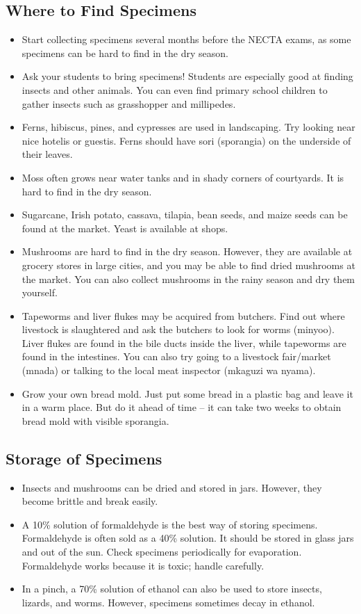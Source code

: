 \subsection{Where to Find Specimens}
\begin{itemize}
\item{Start collecting specimens several months before the NECTA exams, as some specimens can be hard to find in the dry season.}
\item{Ask your students to bring specimens! Students are especially good at finding insects and other animals. You can even find primary school children to gather insects such as grasshopper and millipedes.}
\item{Ferns, hibiscus, pines, and cypresses are used in landscaping. Try looking near nice hotelis or guestis. Ferns should have sori (sporangia) on the underside of their leaves.}
\item{Moss often grows near water tanks and in shady corners of courtyards. It is hard to find in the dry season.}
\item{Sugarcane, Irish potato, cassava, tilapia, bean seeds, and maize seeds can be found at the market. Yeast is available at shops.}
\item{Mushrooms are hard to find in the dry season. However, they are available at grocery stores in large cities, and you may be able to find dried mushrooms at the market. You can also collect mushrooms in the rainy season and dry them yourself.}
\item{Tapeworms and liver flukes may be acquired from butchers. Find out where livestock is slaughtered and ask the butchers to look for worms (minyoo). Liver flukes are found in the bile ducts inside the liver, while tapeworms are found in the intestines. You can also try going to a livestock fair\slash market (mnada) or talking to the local meat inspector (mkaguzi wa nyama).}
\item{Grow your own bread mold. Just put some bread in a plastic bag and leave it in a warm place. But do it ahead of time -- it can take two weeks to obtain bread mold with visible sporangia.}
\end{itemize}

\subsection{Storage of Specimens}
\begin{itemize}
\item{Insects and mushrooms can be dried and stored in jars. However, they become brittle and break easily.}
\item{A 10\% solution of formaldehyde is the best way of storing specimens. Formaldehyde is often sold as a 40\% solution. It should be stored in glass jars and out of the sun. Check specimens periodically for evaporation. Formaldehyde works because it is toxic; handle carefully.}
\item{In a pinch, a 70\% solution of ethanol can also be used to store insects, lizards, and worms. However, specimens sometimes decay in ethanol.}
­­\end{itemize}

